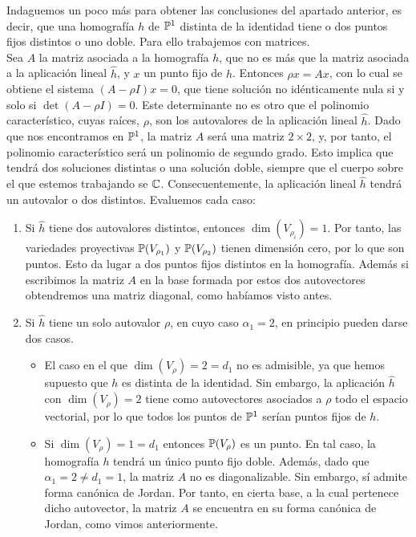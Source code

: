 Indaguemos un poco más para obtener las conclusiones del apartado anterior, es decir, que una homografía $h$ de $\mathbb{P}^1$ distinta de la identidad tiene o dos puntos fijos distintos o uno doble. Para ello trabajemos con matrices.\\

Sea $A$ la matriz asociada a la homografía $h$, que no es más que la matriz asociada a la aplicación lineal $\widehat{h}$, y $x$ un punto fijo de $h$. Entonces $\rho x=Ax$, con lo cual se obtiene el sistema $(A-\rho I)x=0$, que tiene solución no idénticamente nula si y solo si $\det(A-\rho I)=0$. Este determinante no es otro que el polinomio característico, cuyas raíces, $\rho$, son los autovalores de la aplicación lineal $\widehat{h}$. Dado que nos encontramos en $\mathbb{P}^1$, la matriz $A$ será una matriz $2\times 2$, y, por tanto, el polinomio característico será un polinomio de segundo grado. Esto implica que tendrá dos soluciones distintas o una solución doble, siempre que el cuerpo sobre el que estemos trabajando se $\mathbb{C}$. Consecuentemente, la aplicación lineal $\widehat{h}$ tendrá un autovalor o dos distintos. Evaluemos cada caso:
\begin{enumerate}
	\item Si $\widehat{h}$ tiene dos autovalores distintos, entonces $\dim(V_{\rho_i})=1$. Por tanto, las variedades proyectivas $\mathbb{P}(V_{\rho_1})$ y $\mathbb{P}(V_{\rho_2})$ tienen dimensión cero, por lo que son puntos. Esto da lugar a dos puntos fijos distintos en la homografía. Además si escribimos la matriz $A$ en la base formada por estos dos autovectores obtendremos una matriz diagonal, como habíamos visto antes.
	
	\item Si $\widehat{h}$ tiene un solo autovalor $\rho$, en cuyo caso $\alpha_1=2$, en principio pueden darse dos casos.
	\begin{itemize}
		\item El caso en el que $\dim(V_{\rho})=2=d_1$ no es admisible, ya que hemos supuesto que $h$ es distinta de la identidad. Sin embargo, la aplicación $\widehat{h}$ con $\dim(V_{\rho})=2$ tiene como autovectores asociados a $\rho$ todo el espacio vectorial, por lo que todos los puntos de $\mathbb{P}^1$ serían puntos fijos de $h$.
		
		\item Si $\dim(V_{\rho})=1=d_1$ entonces $\mathbb{P}(V_{\rho})$ es un punto. En tal caso, la homografía $h$ tendrá un único punto fijo doble. Además, dado que $\alpha_1=2\not=d_1=1$, la matriz $A$ no es diagonalizable. Sin embargo, sí admite forma canónica de Jordan. Por tanto, en cierta base, a la cual pertenece dicho autovector, la matriz $A$ se encuentra en su forma canónica de Jordan, como vimos anteriormente.
	\end{itemize}
\end{enumerate}
